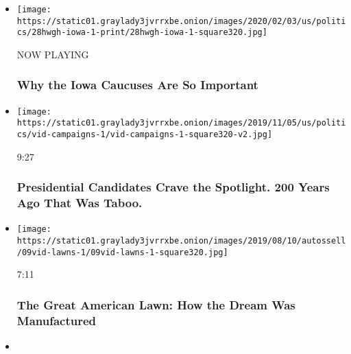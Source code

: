 \begin{itemize}
\item
  \texttt{[image: https://static01.graylady3jvrrxbe.onion/images/2020/02/03/us/politics/28hwgh-iowa-1-print/28hwgh-iowa-1-square320.jpg]}

  NOW PLAYING

  \hypertarget{why-the-iowa-caucuses-are-so-important-2}{%
  \subsubsection{Why the Iowa Caucuses Are So
  Important}\label{why-the-iowa-caucuses-are-so-important-2}}
\item
  \href{https://www.nytimes3xbfgragh.onion/video/us/politics/100000006639814/presidential-candidates-campaigns.html?action=click\&module=video-series-bar\&region=header\&pgtype=Article\&playlistId=video/how-we-got-here}{}

  \texttt{[image: https://static01.graylady3jvrrxbe.onion/images/2019/11/05/us/politics/vid-campaigns-1/vid-campaigns-1-square320-v2.jpg]}

  9:27

  \hypertarget{presidential-candidates-crave-the-spotlight-200-years-ago-that-was-taboo}{%
  \subsubsection{Presidential Candidates Crave the Spotlight. 200 Years
  Ago That Was
  Taboo.}\label{presidential-candidates-crave-the-spotlight-200-years-ago-that-was-taboo}}
\item
  \href{https://www.nytimes3xbfgragh.onion/video/us/100000006542254/climate-change-lawns.html?action=click\&module=video-series-bar\&region=header\&pgtype=Article\&playlistId=video/how-we-got-here}{}

  \texttt{[image: https://static01.graylady3jvrrxbe.onion/images/2019/08/10/autossell/09vid-lawns-1/09vid-lawns-1-square320.jpg]}

  7:11

  \hypertarget{the-great-american-lawn-how-the-dream-was-manufactured}{%
  \subsubsection{The Great American Lawn: How the Dream Was
  Manufactured}\label{the-great-american-lawn-how-the-dream-was-manufactured}}
\item
  \href{https://www.nytimes3xbfgragh.onion/video/us/100000006456208/mexico-border-wall-immigration.html?action=click\&module=video-series-bar\&region=header\&pgtype=Article\&playlistId=video/how-we-got-here}{}


\end{itemize}
